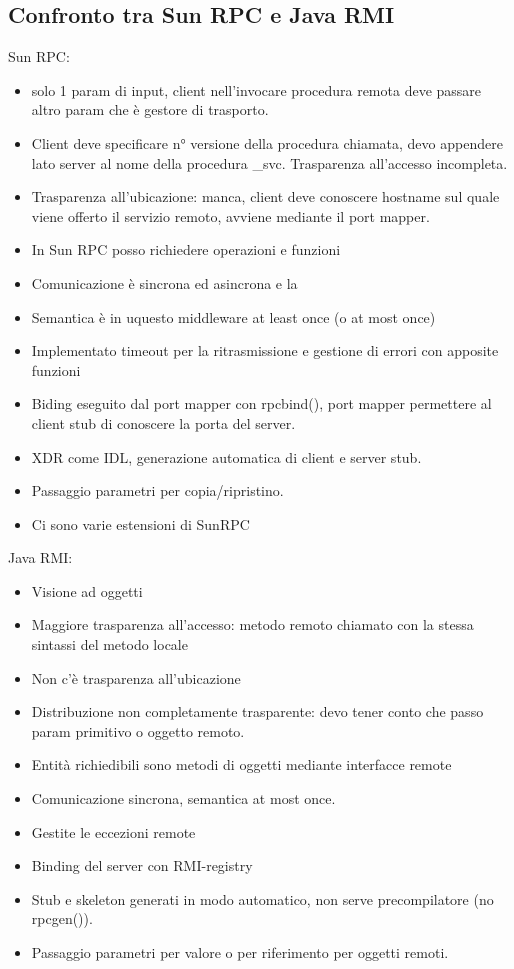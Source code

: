 \documentclass{article}
\begin{document}
\subsection{Confronto tra Sun RPC e Java RMI}
Sun RPC: 
\begin{itemize}
\item solo 1 param di input, client nell'invocare procedura remota deve passare altro param che è gestore di trasporto. 
\item Client deve specificare n° versione della procedura chiamata, devo appendere lato server al nome della procedura \_svc. Trasparenza all'accesso incompleta.\\ 
\item Trasparenza all'ubicazione: manca, client deve conoscere hostname sul quale viene offerto il servizio remoto, avviene mediante il port mapper. 
\item In Sun RPC posso richiedere operazioni e funzioni
\item Comunicazione è sincrona ed asincrona e la 
\item Semantica è in uquesto middleware at least once (o at most once)
\item Implementato timeout per la ritrasmissione e gestione di errori con apposite funzioni
\item Biding eseguito dal port mapper con rpcbind(), port mapper permettere al client stub di conoscere la porta del server.
\item XDR come IDL, generazione automatica di client e server stub.
\item Passaggio parametri per copia/ripristino.
\item Ci sono varie estensioni di SunRPC
\end{itemize}
Java RMI:
\begin{itemize}
\item Visione ad oggetti
\item Maggiore trasparenza all'accesso: metodo remoto chiamato con la stessa sintassi del metodo locale
\item Non c'è trasparenza all'ubicazione
\item Distribuzione non completamente trasparente: devo tener conto che passo param primitivo o oggetto remoto.
\item Entità richiedibili sono metodi di oggetti mediante interfacce remote
\item Comunicazione sincrona, semantica at most once.
\item Gestite le eccezioni remote 
\item Binding del server con RMI-registry
\item Stub e skeleton generati in modo automatico, non serve precompilatore (no rpcgen()).
\item Passaggio parametri per valore o per riferimento per oggetti remoti.
\end{itemize}
\end{document}

